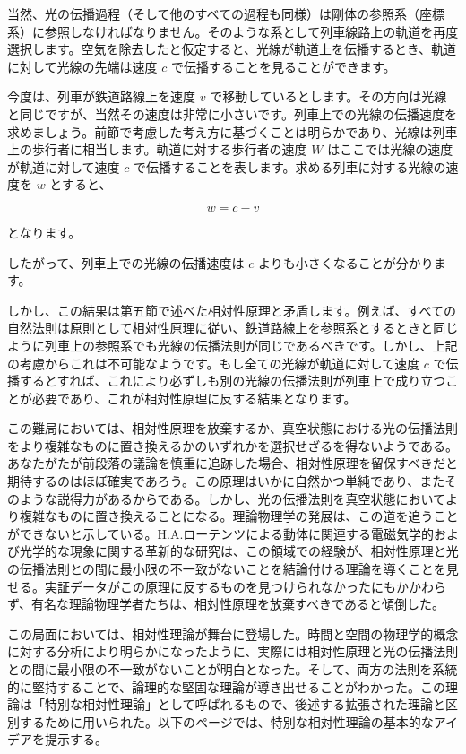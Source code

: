 \documentclass[a4paper,11pt,openany]{ltjsbook}
\begin{document}
当然、光の伝播過程（そして他のすべての過程も同様）は剛体の参照系（座標系）に参照しなければなりません。そのような系として列車線路上の軌道を再度選択します。空気を除去したと仮定すると、光線が軌道上を伝播するとき、軌道に対して光線の先端は速度 $c$ で伝播することを見ることができます。

今度は、列車が鉄道路線上を速度 $v$ で移動しているとします。その方向は光線と同じですが、当然その速度は非常に小さいです。列車上での光線の伝播速度を求めましょう。前節で考慮した考え方に基づくことは明らかであり、光線は列車上の歩行者に相当します。軌道に対する歩行者の速度 $W$ はここでは光線の速度が軌道に対して速度 $c$ で伝播することを表します。求める列車に対する光線の速度を $w$ とすると、

\[
w = c - v
\]

となります。

したがって、列車上での光線の伝播速度は $c$ よりも小さくなることが分かります。

しかし、この結果は第五節で述べた相対性原理と矛盾します。例えば、すべての自然法則は原則として相対性原理に従い、鉄道路線上を参照系とするときと同じように列車上の参照系でも光線の伝播法則が同じであるべきです。しかし、上記の考慮からこれは不可能なようです。もし全ての光線が軌道に対して速度 $c$ で伝播するとすれば、これにより必ずしも別の光線の伝播法則が列車上で成り立つことが必要であり、これが相対性原理に反する結果となります。

この難局においては、相対性原理を放棄するか、真空状態における光の伝播法則をより複雑なものに置き換えるかのいずれかを選択せざるを得ないようである。あなたがたが前段落の議論を慎重に追跡した場合、相対性原理を留保すべきだと期待するのはほぼ確実であろう。この原理はいかに自然かつ単純であり、またそのような説得力があるからである。しかし、光の伝播法則を真空状態においてより複雑なものに置き換えることになる。理論物理学の発展は、この道を追うことができないと示している。H.A.ローテンツによる動体に関連する電磁気学的および光学的な現象に関する革新的な研究は、この領域での経験が、相対性原理と光の伝播法則との間に最小限の不一致がないことを結論付ける理論を導くことを見せる。実証データがこの原理に反するものを見つけられなかったにもかかわらず、有名な理論物理学者たちは、相対性原理を放棄すべきであると傾倒した。

この局面においては、相対性理論が舞台に登場した。時間と空間の物理学的概念に対する分析により明らかになったように、実際には相対性原理と光の伝播法則との間に最小限の不一致がないことが明白となった。そして、両方の法則を系統的に堅持することで、論理的な堅固な理論が導き出せることがわかった。この理論は「特別な相対性理論」として呼ばれるもので、後述する拡張された理論と区別するために用いられた。以下のページでは、特別な相対性理論の基本的なアイデアを提示する。
\end{document}
